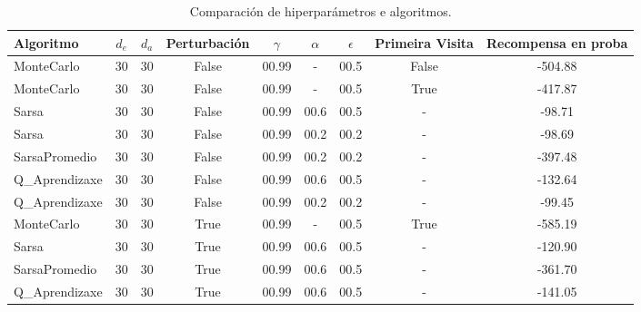 \begin{table}[ht]
\centering
\begin{tabular}{|l|c|c|c|c|c|c|c|c|}
\hline
Algoritmo & $d_e$ & $d_a$ & Perturbación & $\gamma$ & $\alpha$ & $\epsilon$ & Primeira Visita & Recompensa en proba \\ \hline
MonteCarlo & 30 & 30 & False & 00.99 & - & 00.5 & False & -504.88 \\ \hline
MonteCarlo & 30 & 30 & False & 00.99 & - & 00.5 & True & -417.87 \\ \hline
Sarsa & 30 & 30 & False & 00.99 & 00.6 & 00.5 & - & -98.71 \\ \hline
Sarsa & 30 & 30 & False & 00.99 & 00.2 & 00.2 & - & -98.69 \\ \hline
SarsaPromedio & 30 & 30 & False & 00.99 & 00.2 & 00.2 & - & -397.48 \\ \hline
Q_Aprendizaxe & 30 & 30 & False & 00.99 & 00.6 & 00.5 & - & -132.64 \\ \hline
Q_Aprendizaxe & 30 & 30 & False & 00.99 & 00.2 & 00.2 & - & -99.45 \\ \hline
MonteCarlo & 30 & 30 & True & 00.99 & - & 00.5 & True & -585.19 \\ \hline
Sarsa & 30 & 30 & True & 00.99 & 00.6 & 00.5 & - & -120.90 \\ \hline
SarsaPromedio & 30 & 30 & True & 00.99 & 00.6 & 00.5 & - & -361.70 \\ \hline
Q_Aprendizaxe & 30 & 30 & True & 00.99 & 00.6 & 00.5 & - & -141.05 \\ \hline
\end{tabular}
\caption{Comparación de hiperparámetros e algoritmos.}
\label{tab:rl_algorithms}
\end{table}
